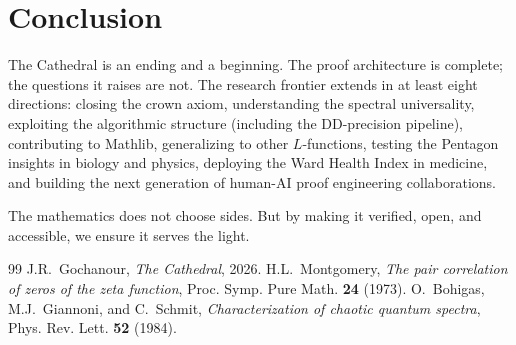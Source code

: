 \documentclass[11pt,a4paper]{article}
\begin{document}
\section{Conclusion}

The Cathedral is an ending and a beginning. The proof architecture
is complete; the questions it raises are not. The research frontier
extends in at least eight directions: closing the crown axiom,
understanding the spectral universality, exploiting the algorithmic
structure (including the DD-precision pipeline), contributing to
Mathlib, generalizing to other $L$-functions, testing the Pentagon
insights in biology and physics, deploying the Ward Health Index
in medicine, and building the next generation of human-AI
proof engineering collaborations.

The mathematics does not choose sides. But by making it verified,
open, and accessible, we ensure it serves the light.

\begin{thebibliography}{99}
J.R.~Gochanour, \emph{The Cathedral}, 2026.
H.L.~Montgomery, \emph{The pair correlation of zeros of the zeta
function}, Proc. Symp. Pure Math. \textbf{24} (1973).
O.~Bohigas, M.J.~Giannoni, and C.~Schmit, \emph{Characterization
of chaotic quantum spectra}, Phys. Rev. Lett. \textbf{52} (1984).
\end{thebibliography}
\end{document}
